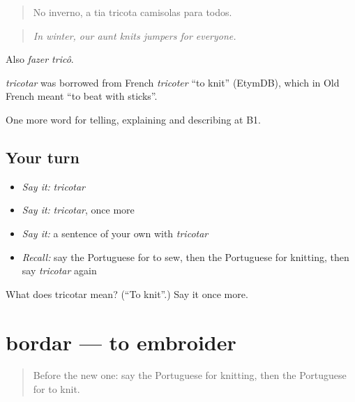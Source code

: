 \begin{quote}
No inverno, a tia tricota camisolas para todos.
\end{quote}

\begin{quote}
\emph{In winter, our aunt knits jumpers for everyone.}
\end{quote}

Also \emph{fazer tricô}.

\begin{cousinweb}
\emph{tricotar} was borrowed from French \emph{tricoter} \textquotedblleft{}to knit\textquotedblright{} (EtymDB), which in Old French meant \textquotedblleft{}to beat with sticks\textquotedblright{}.
\end{cousinweb}

\begin{grammarlens}[title={What you've built}]
One more word for telling, explaining and describing at B1.
\end{grammarlens}

\subsection*{Your turn}
\begin{itemize}
\raggedright
  \item \emph{Say it:} \emph{tricotar}
  \item \emph{Say it:} \emph{tricotar}, once more
  \item \emph{Say it:} a sentence of your own with \emph{tricotar}
  \item \emph{Recall:} say the Portuguese for to sew, then the Portuguese for knitting, then say \emph{tricotar} again
\end{itemize}

\begin{tcolorbox}[breakable,colback=teal!4,colframe=teal!35!black,title={Before you move on}]
What does tricotar mean? (\textquotedblleft{}To knit\textquotedblright{}.) Say it once more.
\end{tcolorbox}
\section[bordar]{bordar — to embroider}

\label{lesson:PT-C500-bordar}



\begin{quote}
Before the new one: say the Portuguese for knitting, then the Portuguese for to knit.
\end{quote}

